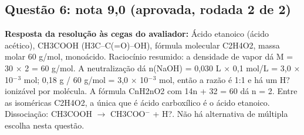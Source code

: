 \documentclass{article}%
\begin{document}
\subsection*{Questão 6: nota 9,0 (aprovada, rodada 2 de 2)}%
\textbf{Resposta da resolução às cegas do avaliador:} Ácido etanoico (ácido acético), CH3COOH (H3C--C(=O)--OH), fórmula molecular C2H4O2, massa molar 60 g/mol, monoácido.\newline%
\newline%
Raciocínio resumido: a densidade de vapor dá M = 30 $\times$ 2 = 60 g/mol. A neutralização dá n(NaOH) = 0,030 L $\times$ 0,1 mol/L = 3,0 $\times$ 10$^{-}$$^3$ mol; 0,18 g / 60 g/mol = 3,0 $\times$ 10$^{-}$$^3$ mol, então a razão é 1:1 e há um H? ionizável por molécula. A fórmula CnH2nO2 com 14n + 32 = 60 dá n = 2. Entre as isoméricas C2H4O2, a única que é ácido carboxílico é o ácido etanoico. Dissociação: CH3COOH $\to$ CH3COO$^{-}$ + H?.\newline%
\newline%
Não há alternativa de múltipla escolha nesta questão.\par %
\end{document}
